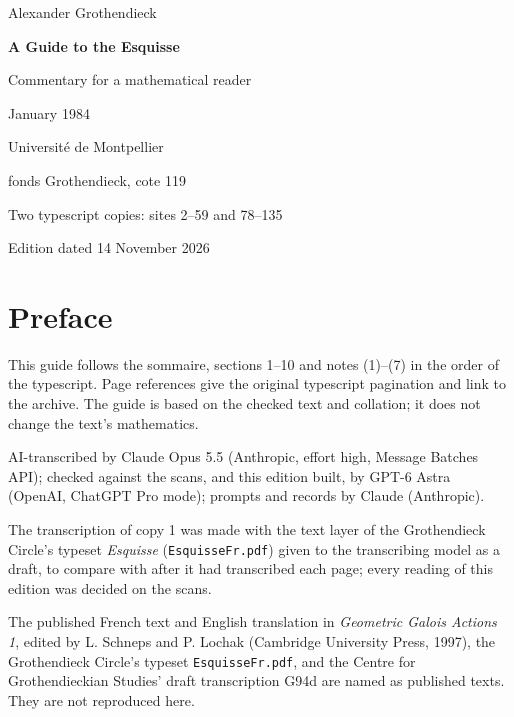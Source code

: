 \documentclass[11pt,a4paper]{article}
\newcommand{\EditionTitle}{A Guide to the Esquisse}
\newcommand{\EditionForm}{Commentary for a mathematical reader}
\begin{document}
\hypersetup{pageanchor=false}
\begin{titlepage}
\centering
\vspace*{18mm}
{\Large Alexander Grothendieck\par}
\vspace{12mm}
{\Huge\bfseries\EditionTitle\par}
\vspace{8mm}
{\Large\EditionForm\par}
\vspace{14mm}
{\large January 1984\par}
\vfill
{\large Université de Montpellier\par fonds Grothendieck, cote 119\par}
\vspace{8mm}
{\normalsize Two typescript copies: sites 2--59 and 78--135\par}
\vspace{8mm}
{\normalsize Edition dated 14 November 2026\par}
\end{titlepage}
\hypersetup{pageanchor=true}
\thispagestyle{plain}
\section*{Preface}

This guide follows the sommaire, sections 1–10 and notes (1)–(7) in the order of the typescript. Page references give the original typescript pagination and link to the archive. The guide is based on the checked text and collation; it does not change the text’s mathematics.

\smallskip
AI-transcribed by Claude Opus 5.5 (Anthropic, effort high, Message Batches API); checked against the scans, and this edition built, by GPT-6 Astra (OpenAI, ChatGPT Pro mode); prompts and records by Claude (Anthropic).


The transcription of copy 1 was made with the text layer of the Grothendieck Circle's typeset \textit{Esquisse} (\texttt{EsquisseFr.pdf}) given to the transcribing model as a draft, to compare with after it had transcribed each page; every reading of this edition was decided on the scans.

The published French text and English translation in \textit{Geometric Galois Actions 1}, edited by L. Schneps and P. Lochak (Cambridge University Press, 1997), the Grothendieck Circle's typeset \texttt{EsquisseFr.pdf}, and the Centre for Grothendieckian Studies' draft transcription G94d are named as published texts. They are not reproduced here.
\end{document}

